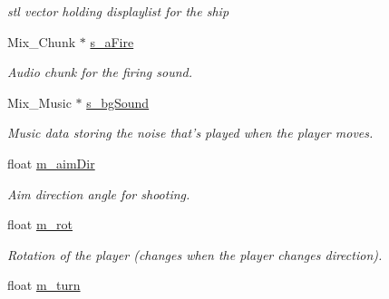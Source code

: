 \begin{DoxyCompactItemize}
\begin{DoxyCompactList}\small\item\em stl vector holding displaylist for the ship \item\end{DoxyCompactList}\item 
\hypertarget{classPlayer_a9627d04600c952222cfbce6a02b04c2f}{
Mix\_\-Chunk $\ast$ \hyperlink{classPlayer_a9627d04600c952222cfbce6a02b04c2f}{s\_\-aFire}}
\label{classPlayer_a9627d04600c952222cfbce6a02b04c2f}

\begin{DoxyCompactList}\small\item\em Audio chunk for the firing sound. \item\end{DoxyCompactList}\item 
\hypertarget{classPlayer_afad023e59830d88ab715731bed494cc3}{
Mix\_\-Music $\ast$ \hyperlink{classPlayer_afad023e59830d88ab715731bed494cc3}{s\_\-bgSound}}
\label{classPlayer_afad023e59830d88ab715731bed494cc3}

\begin{DoxyCompactList}\small\item\em Music data storing the noise that's played when the player moves. \item\end{DoxyCompactList}\item 
\hypertarget{classPlayer_a11b460200664c981a63f7c2561a45511}{
float \hyperlink{classPlayer_a11b460200664c981a63f7c2561a45511}{m\_\-aimDir}}
\label{classPlayer_a11b460200664c981a63f7c2561a45511}

\begin{DoxyCompactList}\small\item\em Aim direction angle for shooting. \item\end{DoxyCompactList}\item 
\hypertarget{classPlayer_a02bc7e439ffbc0b67a1da7e1ec1f84a6}{
float \hyperlink{classPlayer_a02bc7e439ffbc0b67a1da7e1ec1f84a6}{m\_\-rot}}
\label{classPlayer_a02bc7e439ffbc0b67a1da7e1ec1f84a6}

\begin{DoxyCompactList}\small\item\em Rotation of the player (changes when the player changes direction). \item\end{DoxyCompactList}\item 
\hypertarget{classPlayer_add70461d866ea512c676bd845ff8e41c}{
float \hyperlink{classPlayer_add70461d866ea512c676bd845ff8e41c}{m\_\-turn}}
\label{classPlayer_add70461d866ea512c676bd845ff8e41c}


\end{DoxyCompactItemize}
